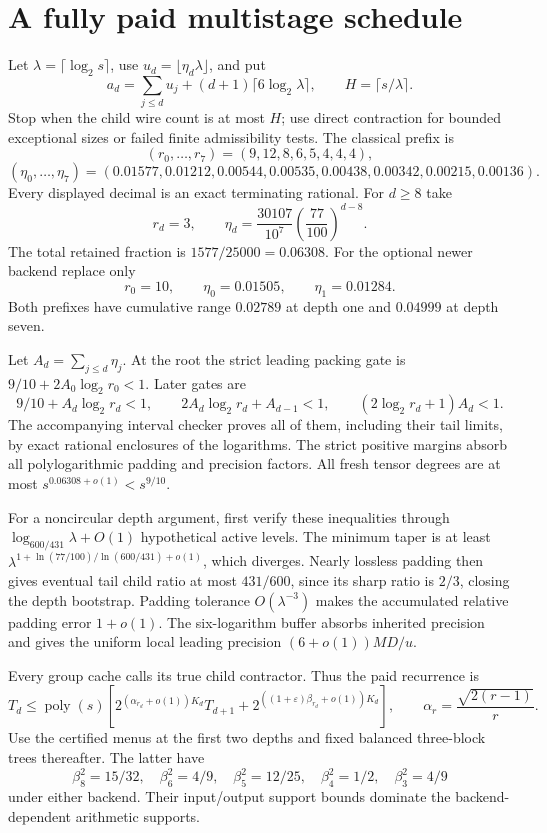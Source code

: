 \section{A fully paid multistage schedule}
\label{sec:paid-new-schedule}

Let $\lambda=\lceil\log_2s\rceil$, use
$u_d=\lfloor\eta_d\lambda\rfloor$, and put
\[
 a_d=\sum_{j\le d}u_j+(d+1)\lceil6\log_2\lambda\rceil,
 \qquad H=\lceil s/\lambda\rceil.
\]
Stop when the child wire count is at most $H$; use direct contraction for
bounded exceptional sizes or failed finite admissibility tests.
The classical prefix is
\[
(r_0,\ldots,r_7)=(9,12,8,6,5,4,4,4),
\]
\[
(\eta_0,\ldots,\eta_7)=
(0.01577,0.01212,0.00544,0.00535,0.00438,0.00342,0.00215,0.00136).
\]
Every displayed decimal is an exact terminating rational. For $d\ge8$ take
\[
 r_d=3,\qquad\eta_d=\frac{30107}{10^7}
                   \left(\frac{77}{100}\right)^{d-8}.
\]
The total retained fraction is $1577/25000=0.06308$.
For the optional newer backend replace only
\[
 r_0=10,\qquad\eta_0=0.01505,\qquad\eta_1=0.01284.
\]
Both prefixes have cumulative range $0.02789$ at depth one and $0.04999$
at depth seven.

Let $A_d=\sum_{j\le d}\eta_j$. At the root the strict leading packing
gate is $9/10+2A_0\log_2r_0<1$. Later gates are
\[
9/10+A_d\log_2r_d<1,\qquad
2A_d\log_2r_d+A_{d-1}<1,\qquad
(2\log_2r_d+1)A_d<1.
\]
The accompanying interval checker proves all of them, including their tail
limits, by exact rational enclosures of the logarithms. The strict positive
margins absorb all polylogarithmic padding and precision factors.
All fresh tensor degrees are at most $s^{0.06308+o(1)}<s^{9/10}$.

For a noncircular depth argument, first verify these inequalities through
$\log_{600/431}\lambda+O(1)$ hypothetical active levels. The minimum taper is
at least $\lambda^{1+\ln(77/100)/\ln(600/431)+o(1)}$, which diverges.
Nearly lossless padding then gives eventual tail child ratio at most $431/600$,
since its sharp ratio is $2/3$, closing the depth bootstrap. Padding tolerance
$O(\lambda^{-3})$ makes the accumulated relative padding error $1+o(1)$.
The six-logarithm buffer absorbs inherited precision and gives the uniform
local leading precision $(6+o(1))MD/u$.

Every group cache calls its true child contractor. Thus the paid recurrence is
\[
 T_d\le\operatorname{poly}(s)
 \left[2^{(\alpha_{r_d}+o(1))K_d}T_{d+1}
       +2^{((1+\varepsilon)\beta_{r_d}+o(1))K_d}\right],
 \qquad\alpha_r=\frac{\sqrt{2(r-1)}}r.
\]
Use the certified menus at the first two depths and fixed balanced
three-block trees thereafter. The latter have
\[
 \beta_8^2=15/32,\quad\beta_6^2=4/9,\quad\beta_5^2=12/25,
 \quad\beta_4^2=1/2,\quad\beta_3^2=4/9
\]
under either backend. Their input/output support bounds dominate the
backend-dependent arithmetic supports.

